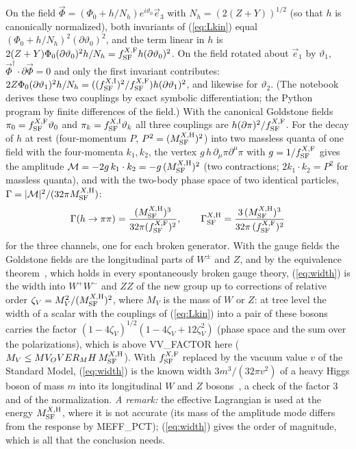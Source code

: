 \documentclass[aps,prd,onecolumn,superscriptaddress,nofootinbib,floatfix,longbibliography]{revtex4-2}
\newcommand{\SF}{{\rm SF}}
\begin{document}
On the field $\vec\Phi=(\Phi_0+h/N_h)e^{i\vartheta_0}\vec e_3$ with $N_h=(2(Z+Y))^{1/2}$ (so that $h$ is canonically normalized), both invariants
of (\ref{eq:Lkin}) equal $(\Phi_0+h/N_h)^2(\partial\vartheta_0)^2$, and the term linear in $h$ is $2(Z+Y)\Phi_0(\partial\vartheta_0)^2h/N_h=
f^{X,{\rm F}}_\SF h(\partial\vartheta_0)^2$. On the field rotated about $\vec e_1$ by $\vartheta_1$, $\vec\Phi^\dagger\cdot\partial\vec\Phi=0$ and only the first
invariant contributes: $2Z\Phi_0(\partial\vartheta_1)^2h/N_h=((f^{X,{\rm I}}_\SF)^2/f^{X,{\rm F}}_\SF)h(\partial\vartheta_1)^2$, and likewise for $\vartheta_2$.
(The notebook derives these two couplings by exact symbolic differentiation; the Python program by finite differences of the field.)
With the canonical Goldstone fields $\pi_0=f^{X,{\rm F}}_\SF\vartheta_0$ and $\pi_k=f^{X,{\rm I}}_\SF\vartheta_k$ all three couplings are
$h(\partial\pi)^2/f^{X,{\rm F}}_\SF$. For the decay of $h$ at rest (four-momentum $P$, $P^2=(M^{X,{\rm H}}_\SF)^2$) into two massless quanta of one field
with the four-momenta $k_1,k_2$, the vertex $g\,h\,\partial_\mu\pi\partial^\mu\pi$ with $g=1/f^{X,{\rm F}}_\SF$ gives the amplitude
$\mathcal M=-2g\,k_1\cdot k_2=-g\,(M^{X,{\rm H}}_\SF)^2$ (two contractions; $2k_1\cdot k_2=P^2$ for massless quanta), and with the two-body phase space
of two identical particles, $\Gamma=|\mathcal M|^2/(32\pi M^{X,{\rm H}}_\SF)$:
\begin{equation}
\Gamma(h\to\pi\pi)=\frac{(M^{X,{\rm H}}_\SF)^3}{32\pi(f^{X,{\rm F}}_\SF)^2},\qquad\Gamma^{X,{\rm H}}_\SF=\frac{3\,(M^{X,{\rm H}}_\SF)^3}{32\pi\,(f^{X,{\rm F}}_\SF)^2}
\label{eq:width}
\end{equation}
for the three channels, one for each broken generator. With the gauge fields the Goldstone fields are the longitudinal parts of
$W^\pm$ and $Z$, and by the equivalence theorem~\cite{CLT1974,ChanowitzGaillard1985}, which holds in every spontaneously broken gauge
theory, (\ref{eq:width}) is the width into $W^+W^-$ and $ZZ$ of the new group up to corrections of relative order
$\zeta_V=M_V^2/(M^{X,{\rm H}}_\SF)^2$, where $M_V$ is the mass of $W$ or $Z$: at tree level the width of a scalar with the couplings of (\ref{eq:Lkin})
into a pair of these bosons carries the factor $(1-4\zeta_V)^{1/2}(1-4\zeta_V+12\zeta_V^2)$ (phase space and the sum over the polarizations), which
is above {{VV_FACTOR}} here ($M_V\le{{MV_OVER_MH}}\,M^{X,{\rm H}}_\SF$). With $f^{X,{\rm F}}_\SF$ replaced by the vacuum value $v$
of the Standard Model, (\ref{eq:width}) is the known width $3m^3/(32\pi v^2)$ of a heavy Higgs boson of mass $m$ into its
longitudinal $W$ and $Z$ bosons~\cite{LQT1977}, a check of the factor 3 and of the normalization. \emph{A remark:} the effective
Lagrangian is used at the energy $M^{X,{\rm H}}_\SF$, where it is not accurate (its mass of the amplitude mode differs from the response
by {{MEFF_PCT}}); (\ref{eq:width}) gives the order of magnitude, which is all that the conclusion needs.
\end{document}
